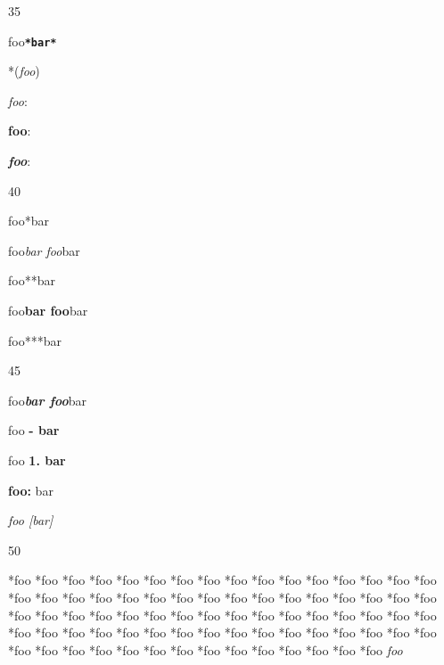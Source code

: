35

foo\textbf{\texttt{*bar*}}

*(\emph{foo})

\emph{foo}:

\textbf{foo}:

\textbf{\emph{foo}}:

40

foo*bar

foo\emph{bar foo}bar

foo**bar

foo\textbf{bar foo}bar

foo***bar

45

foo\textbf{\emph{bar foo}}bar

foo \textbf{- bar}

foo \textbf{1. bar}

\textbf{foo:} bar

\emph{foo {[bar]}}

50

*foo
*foo
*foo
*foo
*foo
*foo
*foo
*foo
*foo
*foo
*foo
*foo
*foo
*foo
*foo
*foo
*foo
*foo
*foo
*foo
*foo
*foo
*foo
*foo
*foo
*foo
*foo
*foo
*foo
*foo
*foo
*foo
*foo
*foo
*foo
*foo
*foo
*foo
*foo
*foo
*foo
*foo
*foo
*foo
*foo
*foo
*foo
*foo
*foo
*foo
*foo
*foo
*foo
*foo
*foo
*foo
*foo
*foo
*foo
*foo
*foo
*foo
*foo
*foo
*foo
*foo
*foo
*foo
*foo
*foo
*foo
*foo
*foo
*foo
*foo
*foo
*foo
*foo
\emph{foo}



